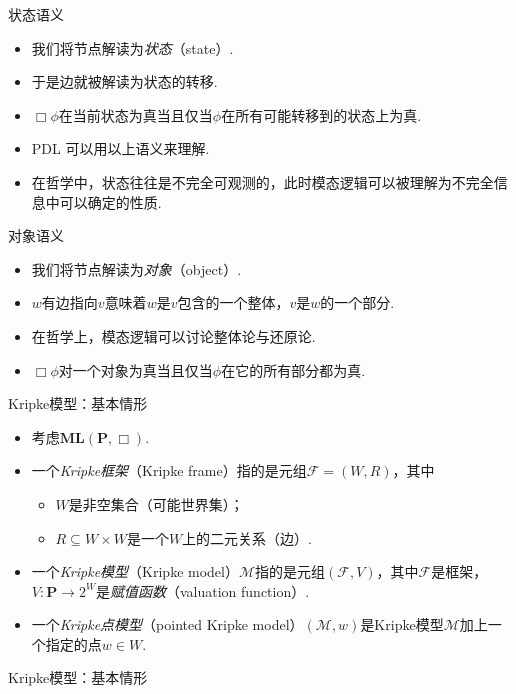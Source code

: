     
    {状态语义}
    \begin{itemize}
    \item 我们将节点解读为\emph{状态}（state）.
    \item 于是边就被解读为状态的转移.
    \item $\Box\phi$在当前状态为真当且仅当$\phi$在所有可能转移到的状态上为真.
    \item PDL 可以用以上语义来理解.
    \item 在哲学中，状态往往是不完全可观测的，此时模态逻辑可以被理解为不完全信息中可以确定的性质.
    \end{itemize}
    
    
    {对象语义}
    \begin{itemize}
    \item 我们将节点解读为\emph{对象}（object）.
    \item $w$有边指向$v$意味着$w$是$v$包含的一个整体，$v$是$w$的一个部分.
    \item 在哲学上，模态逻辑可以讨论整体论与还原论.
    \item $\Box\phi$对一个对象为真当且仅当$\phi$在它的所有部分都为真.
    \end{itemize}
    
    
    {Kripke模型：基本情形}
    \begin{itemize}
        \item 考虑$\mathbf{ML}(\mathbf{P},\Box)$.
        \item 一个\emph{Kripke框架}（Kripke frame）指的是元组$\mathcal F=(W,R)$，其中
        \begin{itemize}
            \item $W$是非空集合（可能世界集）；
            \item $R\subseteq W\times W$是一个$W$上的二元关系（边）.
        \end{itemize}
        \item 一个\emph{Kripke模型}（Kripke model）$\mathcal{M}$指的是元组$(\mathcal F,V)$，其中$\mathcal F$是框架，$V:\mathbf P\to 2^W$是\emph{赋值函数}（valuation function）.
        \item 一个\emph{Kripke点模型}（pointed Kripke model）$(\mathcal{M},w)$是Kripke模型$\mathcal M$加上一个指定的点$w\in W$.
    \end{itemize}
    
    
    {Kripke模型：基本情形}
    \begin{figure}
        \centering
        
    \end{figure}
    
